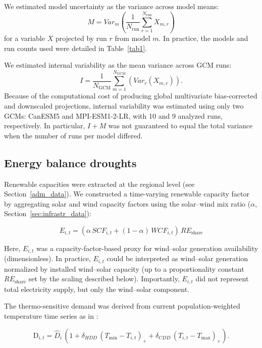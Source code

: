 \documentclass[pdflatex,sn-mathphys-num]{sn-jnl}%
\begin{document}
We estimated model uncertainty as the variance across model means:
\begin{equation}
    M = Var_m\left(\frac{1}{N_{\mathrm{run}}}\sum_{r=1}^{N_{\mathrm{run}}} X_{m,r}\right)
\end{equation}
for a variable $X$ projected by run $r$ from model $m$. In practice, the models and run counts used were detailed in Table~\ref{tab1}.

We estimated internal variability as the mean variance across GCM runs:
\begin{equation}
    I = \frac{1}{N_{\mathrm{GCM}}}\sum_{m=1}^{N_{\mathrm{GCM}}}\left(Var_r\left(X_{m,r}\right)\right).
\end{equation}
Because of the computational cost of producing global multivariate bias-corrected and downscaled projections, internal variability was estimated using only two GCMs: CanESM5 and MPI-ESM1-2-LR, with 10 and 9 analyzed runs, respectively. In particular, $I + M$ was not guaranteed to equal the total variance when the number of runs per model differed.

\subsection{Energy balance droughts}\label{sec:meth:supply-demand}

Renewable capacities were extracted at the regional level (see Section~\ref{adm_data}). 
We constructed a time-varying renewable capacity factor by aggregating solar and wind capacity factors using the solar–wind mix ratio ($\alpha$, Section~\ref{sec:infrastr_data}):

\begin{equation}
    E_{i,t} = (\alpha  \, SCF_{i,t} + (1-\alpha)\, WCF_{i,t})\, RE_{\text{share}}
\end{equation}

Here, $E_{i,t}$ was a capacity-factor-based proxy for wind–solar generation availability (dimensionless). In practice, $E_{i,t}$ could be interpreted as wind–solar generation normalized by installed wind–solar capacity (up to a proportionality constant $RE_{\text{share}}$ set by the scaling described below). Importantly, $E_{i,t}$ did not represent total electricity supply, but only the wind–solar component.

The thermo-sensitive demand was derived from current population-weighted temperature time series as in \cite{zhengStrategiesClimateresilientGlobal2025}: 

\begin{equation}
    \text{D}_{i,t} = \hat D_i \, \left(1 + \delta_{HDD}\, (T_{\text{min}}-T_{i,t})_+ + \delta_{CDD}\, (T_{i,t} -T_{\text{max}})_+\right).
\end{equation}
\end{document}
